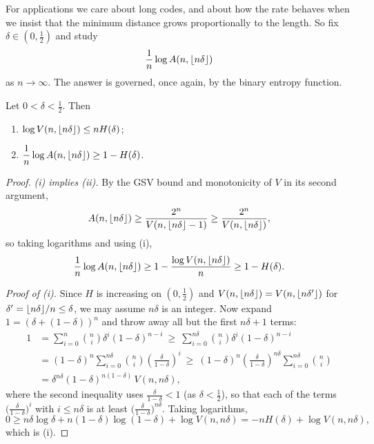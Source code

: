 \documentclass[a4paper]{scrartcl}
\DeclarePairedDelimiter{\floor}{\lfloor}{\rfloor}
\begin{document}
For applications we care about long codes, and about how the rate behaves when we insist that the minimum distance grows proportionally to the length. So fix $\delta \in (0,\tfrac12)$ and study
$$\frac{1}{n}\log A(n, \floor{n\delta})$$
as $n \to \infty$. The answer is governed, once again, by the binary entropy function.

\begin{proposition}\label{prop:volbound}
	Let $0 < \delta < \tfrac12$. Then
	\begin{enumerate}[label=(\roman*)]
		\item $\log V(n,\floor{n\delta}) \le n H(\delta)$;
		\item $\dfrac{1}{n}\log A(n,\floor{n\delta}) \ge 1 - H(\delta)$.
	\end{enumerate}
\end{proposition}

\begin{proof}
	\emph{(i) implies (ii).} By the GSV bound and monotonicity of $V$ in its second argument,
	$$A(n,\floor{n\delta}) \ge \frac{2^n}{V(n,\floor{n\delta}-1)} \ge \frac{2^n}{V(n,\floor{n\delta})},$$
	so taking logarithms and using (i),
	$$\frac1n \log A(n,\floor{n\delta}) \ge 1 - \frac{\log V(n,\floor{n\delta})}{n} \ge 1 - H(\delta).$$

	\emph{Proof of (i).} Since $H$ is increasing on $(0,\tfrac12)$ and $V(n, \floor{n\delta}) = V(n, \floor{n\delta'})$ for $\delta' = \floor{n\delta}/n \le \delta$, we may assume $n\delta$ is an integer. Now expand $1 = (\delta + (1-\delta))^n$ and throw away all but the first $n\delta+1$ terms:
	\begin{align*}
		1 &= \sum_{i=0}^n \binom{n}{i}\delta^i(1-\delta)^{n-i} \ \ge\  \sum_{i=0}^{n\delta}\binom{n}{i}\delta^i(1-\delta)^{n-i}\\
		&= (1-\delta)^n \sum_{i=0}^{n\delta}\binom{n}{i}\left(\frac{\delta}{1-\delta}\right)^{\!i} \ \ge\  (1-\delta)^n\left(\frac{\delta}{1-\delta}\right)^{\!n\delta}\sum_{i=0}^{n\delta}\binom{n}{i}\\
		&= \delta^{n\delta}(1-\delta)^{n(1-\delta)}\,V(n,n\delta),
	\end{align*}
	where the second inequality uses $\frac{\delta}{1-\delta} < 1$ (as $\delta< \tfrac12$), so that each of the terms $\bigl(\tfrac{\delta}{1-\delta}\bigr)^i$ with $i \le n\delta$ is at least $\bigl(\tfrac{\delta}{1-\delta}\bigr)^{n\delta}$. Taking logarithms,
	$$0 \ge n\delta \log\delta + n(1-\delta)\log(1-\delta) + \log V(n,n\delta) = -nH(\delta) + \log V(n,n\delta),$$
	which is (i).
\end{proof}
\end{document}
